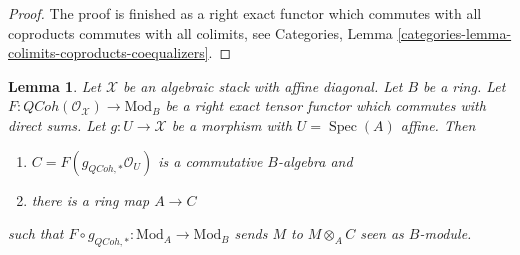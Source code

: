\documentclass{stacks-project}
\theoremstyle{plain}
\newtheorem{lemma}[subsection]{Lemma}
\theoremstyle{definition}
\theoremstyle{remark}
\numberwithin{equation}{subsection}
\def\Spec{\mathop{\mathrm{Spec}}}
\def\QCoh{\mathit{QCoh}}
\begin{document}
\begin{proof}
\medskip\noindent
The proof is finished as a right exact functor which commutes with all
coproducts commutes with all colimits, see
Categories, Lemma \ref{categories-lemma-colimits-coproducts-coequalizers}.
\end{proof}

\begin{lemma}
\label{lemma-affine}
Let $\mathcal{X}$ be an algebraic stack with affine diagonal.
Let $B$ be a ring. Let $F : \QCoh(\mathcal{O}_\mathcal{X}) \to \text{Mod}_B$
be a right exact tensor functor which commutes with direct sums.
Let $g : U \to \mathcal{X}$ be a morphism with $U = \Spec(A)$ affine. Then
\begin{enumerate}
\item $C = F(g_{\QCoh, *}\mathcal{O}_U)$ is a commutative $B$-algebra and
\item there is a ring map $A \to C$
\end{enumerate}
such that $F \circ g_{\QCoh, *} : \text{Mod}_A \to \text{Mod}_B$
sends $M$ to $M \otimes_A C$ seen as $B$-module.
\end{lemma}
\end{document}
